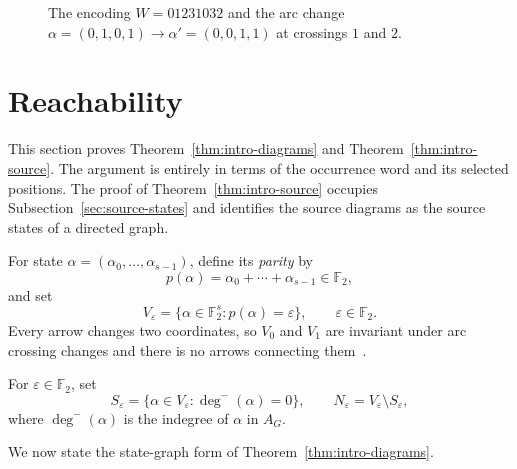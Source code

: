 \documentclass[11pt]{amsart}
\theoremstyle{definition}
\theoremstyle{remark}
\newcommand{\F}{\mathbb F_2}
\newcommand{\FigureEightSegment}[2]{%
  \draw[#1]
    plot[samples=180,smooth,domain=#2,variable=\t]
    ({(2+cos(2*\t))*cos(3*\t)},
     {(2+cos(2*\t))*sin(3*\t)});%
}
\begin{document}
\begin{figure}[ht]
\caption{The encoding \(W=01231032\) and the arc change
\(\alpha=(0,1,0,1)\to\alpha'=(0,0,1,1)\) at crossings \(1\) and \(2\).}
\label{fig:occurrence-encoding}
\end{figure}

\section{Reachability}
\label{sec:reverse}

This section proves Theorem~\ref{thm:intro-diagrams} and
Theorem~\ref{thm:intro-source}.  The argument is entirely in terms of the
occurrence word and its selected positions.  The proof of
Theorem~\ref{thm:intro-source} occupies Subsection~\ref{sec:source-states}
and identifies the source diagrams as the source states of a directed
graph.  

For state \(\alpha=(\alpha_0,\ldots,\alpha_{s-1})\), define its
\emph{parity} by
\begin{equation}\label{eq:parity}
  p(\alpha)=\alpha_0+\cdots+\alpha_{s-1}\in\F,
\end{equation}
and set
\[
  V_\varepsilon=\{\alpha\in\F^s:p(\alpha)=\varepsilon\},
  \qquad \varepsilon\in\F.
\]
Every arrow changes two coordinates, so \(V_0\) and \(V_1\) are invariant
under arc crossing changes and there is no arrows connecting them~\cite[Proposition~4.2(3)]{ChengLiaoSong2025}.

For \(\varepsilon\in\F\), set
\[
  S_\varepsilon=\{\alpha\in V_\varepsilon:\deg^-(\alpha)=0\},
  \qquad N_\varepsilon=V_\varepsilon\setminus S_\varepsilon,
\]
where $\deg^-(\alpha) $ is the indegree of $\alpha$ in $A_G$.

We now state the state-graph form of Theorem~\ref{thm:intro-diagrams}.  
\end{document}

